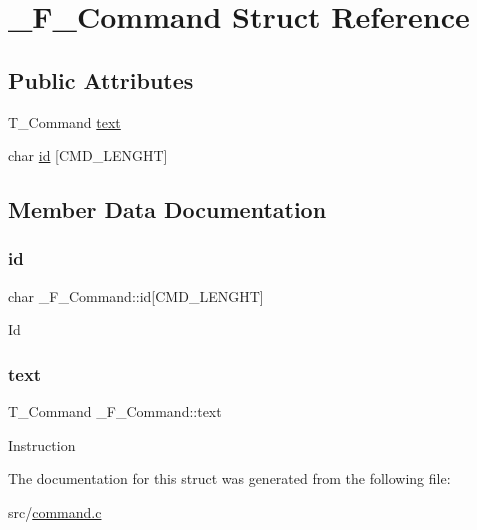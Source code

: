 \hypertarget{struct__F__Command}{}\section{\+\_\+\+F\+\_\+\+Command Struct Reference}
\label{struct__F__Command}
\subsection*{Public Attributes}
\begin{DoxyCompactItemize}
\item 
T\+\_\+\+Command \hyperlink{struct__F__Command_a6a2c6e6db16dad0da7732cea69c07559}{text}
\item 
char \hyperlink{struct__F__Command_a138723d3b8278597200ae2ff43d8ef74}{id} \mbox{[}C\+M\+D\+\_\+\+L\+E\+N\+G\+HT\mbox{]}
\end{DoxyCompactItemize}


\subsection{Member Data Documentation}
\mbox{\label{struct__F__Command_a138723d3b8278597200ae2ff43d8ef74}} 
\subsubsection{\texorpdfstring{id}{id}}
{\footnotesize\ttfamily char \+\_\+\+F\+\_\+\+Command\+::id\mbox{[}C\+M\+D\+\_\+\+L\+E\+N\+G\+HT\mbox{]}}

Id \mbox{\label{struct__F__Command_a6a2c6e6db16dad0da7732cea69c07559}} 
\subsubsection{\texorpdfstring{text}{text}}
{\footnotesize\ttfamily T\+\_\+\+Command \+\_\+\+F\+\_\+\+Command\+::text}

Instruction 

The documentation for this struct was generated from the following file\+:\begin{DoxyCompactItemize}
\item 
src/\hyperlink{command_8c}{command.\+c}\end{DoxyCompactItemize}
